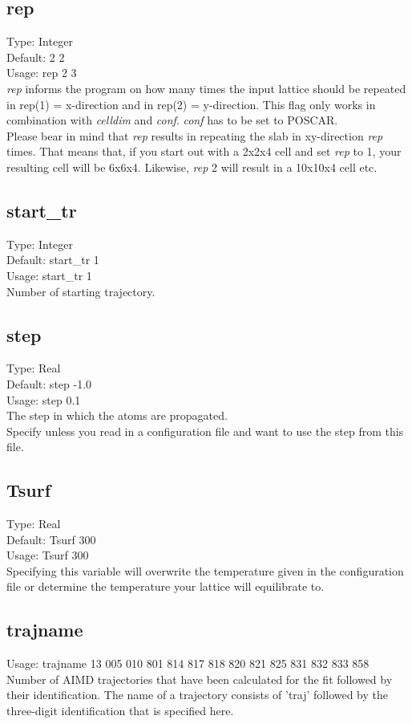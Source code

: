 \documentclass[twoside, 11pt, titlepage, captions=nooneline, a4paper, headsepline]{scrbook}%
\begin{document}
\subsection*{rep}
Type: Integer\\
Default: 2 2\\
Usage: rep 2 3\\
\emph{rep} informs the program on how many times the input lattice should be repeated in rep(1) = x-direction and in rep(2) = y-direction. This flag only works in combination with \emph{celldim} and \emph{conf}. \emph{conf} has to be set to POSCAR.\\
Please bear in mind that \emph{rep} results in repeating the slab in xy-direction \emph{rep} times. That means that, if you start out with a 2x2x4 cell and set \emph{rep} to 1, your resulting cell will be 6x6x4. Likewise, \emph{rep} 2 will result in a 10x10x4 cell etc.

\subsection*{start\_tr}
Type: Integer\\
Default: start\_tr 1\\
Usage: start\_tr 1\\
Number of starting trajectory.

\subsection*{step}
Type: Real\\
Default: step -1.0\\
Usage: step 0.1\\
The step in which the atoms are propagated.\\
Specify unless you read in a configuration file and want to use the step from this file.

\subsection*{Tsurf}
Type: Real\\
Default: Tsurf 300\\
Usage: Tsurf 300\\
Specifying this variable will overwrite the temperature given in the configuration file or determine the temperature your lattice will equilibrate to.

\subsection*{trajname}
Usage: trajname 13 005 010 801 814 817 818 820 821 825 831 832 833 858\\
Number of AIMD trajectories that have been calculated for the fit followed by their identification. The name of a trajectory consists of 'traj' followed by the three-digit identification that is specified here.
\end{document}
